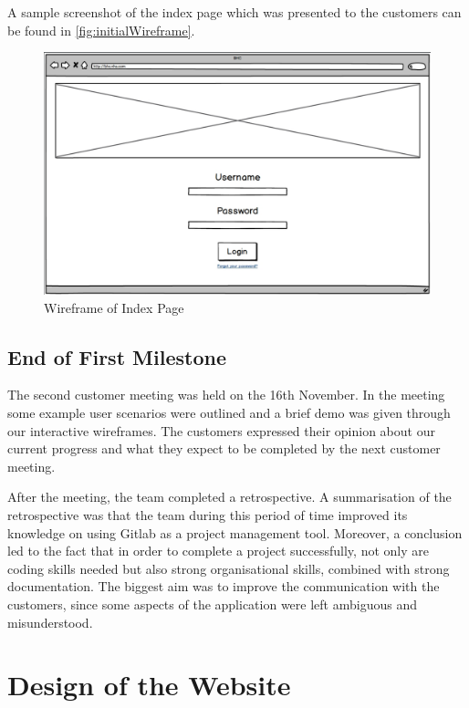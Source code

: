 \documentclass{l3proj}
\begin{document}
A sample screenshot of the index page which was presented to the customers can be found in \autoref{fig:initialWireframe}.

\begin{figure}[h]
\centerline{\includegraphics[width=\textwidth, height=\textheight, keepaspectratio]{wireframe.png}}
\caption{Wireframe of Index Page}
\label{fig:initialWireframe}
\end{figure}



\subsection{End of First Milestone}
\label{sec:milestone1}

The second customer meeting was held on the 16th November. In the meeting some example user scenarios were outlined and a brief demo was given through our interactive wireframes. The customers expressed their opinion about our current progress and what they expect to be completed by the next customer meeting.

After the meeting, the team completed a retrospective. A summarisation of the retrospective was that the team during this period of time improved its knowledge on using Gitlab as a project management tool. Moreover, a conclusion led to the fact that in order to complete a project successfully, not only are coding skills needed but also strong organisational skills, combined with strong documentation. The biggest aim was to improve the communication with the customers, since some aspects of the application were left ambiguous and misunderstood.


\section{Design of the Website}
\label{sec:design}
\end{document}
